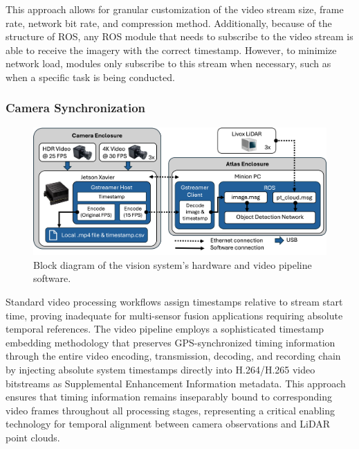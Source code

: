 \documentclass{erauthesis}
\begin{document}
This approach allows for granular customization of the video stream size, frame rate, network bit rate, and compression method. 
Additionally, because of the structure of ROS, any ROS module that needs to subscribe to the video stream is able to receive the imagery with the correct timestamp. However, to minimize network load, modules only subscribe to this stream when necessary, such as when a specific task is being conducted. 


\subsubsection{Camera Synchronization} \label{time_sync_cam}

\begin{figure}[ht]
\centering
\includegraphics[width=5in]{Images/Video_Block_Diagram.png}
\caption{Block diagram of the vision system's hardware and video pipeline software.}
\label{video_pipeline}
\end{figure}


Standard video processing workflows assign timestamps relative to stream start time, proving inadequate for multi-sensor fusion applications requiring absolute temporal references.
The video pipeline employs a sophisticated timestamp embedding methodology that preserves GPS-synchronized timing information through the entire video encoding, transmission, decoding, and recording chain by injecting absolute system timestamps directly into H.264/H.265 video bitstreams as Supplemental Enhancement Information metadata.
This approach ensures that timing information remains inseparably bound to corresponding video frames throughout all processing stages, representing a critical enabling technology for temporal alignment between camera observations and LiDAR point clouds.
\end{document}
